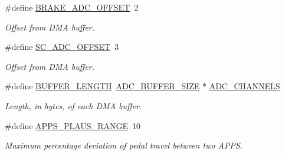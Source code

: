 \begin{DoxyCompactItemize}
\mbox{\label{group___board__model__group_gade98eccd60c9b68cde78ca4c0009a84c}} 
\#define \mbox{\hyperlink{group___board__model__group_gade98eccd60c9b68cde78ca4c0009a84c}{B\+R\+A\+K\+E\+\_\+\+A\+D\+C\+\_\+\+O\+F\+F\+S\+ET}}~2
\begin{DoxyCompactList}\small\item\em Offset from D\+MA buffer. \end{DoxyCompactList}\item 
\mbox{\label{group___board__model__group_ga58133efa918e1af6c0cc436137c78cc0}} 
\#define \mbox{\hyperlink{group___board__model__group_ga58133efa918e1af6c0cc436137c78cc0}{S\+C\+\_\+\+A\+D\+C\+\_\+\+O\+F\+F\+S\+ET}}~3
\begin{DoxyCompactList}\small\item\em Offset from D\+MA buffer. \end{DoxyCompactList}\item 
\mbox{\label{group___board__model__group_gaf7b7dc9a200cb1404c280bd500fd1551}} 
\#define \mbox{\hyperlink{group___board__model__group_gaf7b7dc9a200cb1404c280bd500fd1551}{B\+U\+F\+F\+E\+R\+\_\+\+L\+E\+N\+G\+TH}}~\mbox{\hyperlink{group___board__model__group_ga602abb8ec84dcb3b6f854a738310ea46}{A\+D\+C\+\_\+\+B\+U\+F\+F\+E\+R\+\_\+\+S\+I\+ZE}} $\ast$ \mbox{\hyperlink{group___board__model__group_ga065dcfa648ca52ed6214008cb177de36}{A\+D\+C\+\_\+\+C\+H\+A\+N\+N\+E\+LS}}
\begin{DoxyCompactList}\small\item\em Length, in bytes, of each D\+MA buffer. \end{DoxyCompactList}\item 
\mbox{\label{group___board__model__group_ga3e1022cd2e2154437b583f7ff83f2960}} 
\#define \mbox{\hyperlink{group___board__model__group_ga3e1022cd2e2154437b583f7ff83f2960}{A\+P\+P\+S\+\_\+\+P\+L\+A\+U\+S\+\_\+\+R\+A\+N\+GE}}~10
\begin{DoxyCompactList}\small\item\em Maximum percentage deviation of pedal travel between two A\+P\+PS. \end{DoxyCompactList}\item 
\mbox{\label{group___board__model__group_ga6741cba3daf129b6f73eed1b1db09519}} 

\end{DoxyCompactItemize}
